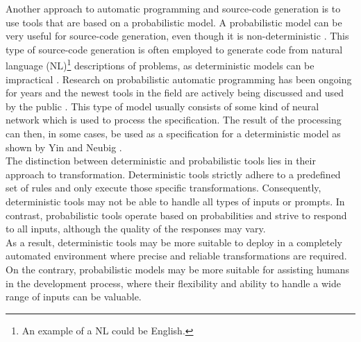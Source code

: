 Another approach to automatic programming and source-code generation is to use tools that are based on a probabilistic model.
A probabilistic model can be very useful for source-code generation, even though it is non-deterministic \cite{chenEvaluatingLargeLanguage2021}.
This type of source-code generation is often employed to generate code from natural language (NL)\footnote{
    An example of a NL could be English.
}
descriptions of problems, as deterministic models can be impractical \cite{alonStructuralLanguageModels2020}.
Research on probabilistic automatic programming has been ongoing for years and the newest tools in the field are actively being discussed and used by the public \cite{WhatChatGPTWhy, johnmaedaChoosingLLMModel2023}.
This type of model usually consists of some kind of neural network which is used to process the specification. 
The result of the processing can then, in some cases, be used as a specification for a deterministic model as shown by Yin and Neubig \cite{yinSyntacticNeuralModel2017}.\\
The distinction between deterministic and probabilistic tools lies in their approach to transformation. Deterministic tools strictly adhere to a predefined set of rules and only execute those specific transformations. Consequently, deterministic tools may not be able to handle all types of inputs or prompts.
In contrast, probabilistic tools operate based on probabilities and strive to respond to all inputs, although the quality of the responses may vary.\\
As a result, deterministic tools may be more suitable to deploy in a completely automated environment where precise and reliable transformations are required.
On the contrary, probabilistic models may be more suitable for assisting humans in the development process, where their flexibility and ability to handle a wide range of inputs can be valuable.